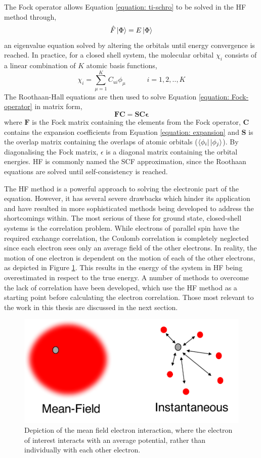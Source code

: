 The Fock operator allows Equation \ref{equation: ti-schro} to be solved in the \ac{HF} method through,
\begin{equation}\label{equation: Fock-operator}
    \hat{F}\ket{\Phi}=E\ket{\Phi}
\end{equation}
an eigenvalue equation solved by altering the orbitals until energy convergence is reached. In practice, for a closed shell system, the molecular orbital $\chi_{i}$ consists of a linear combination of $K$ atomic basis functions,
\begin{equation}\label{equation: expansion}
    \chi_{i}=\sum_{\mu=1}^{K}C_{ui}\phi_{\mu}\qquad\quad{}i=1,2,..,K
\end{equation}
The Roothaan-Hall equations are then used to solve Equation \ref{equation: Fock-operator} in matrix form,\cite{Roothaan1951,Hall1951}
\begin{equation}
    \bm{FC}={\bm{SC\epsilon}}
\end{equation}
where $\bm{F}$ is the Fock matrix containing the elements from the Fock operator, $\bm{C}$ contains the expansion coefficients from Equation \ref{equation: expansion} and $\bm{S}$ is the overlap matrix containing the overlaps of atomic orbitals ($\bra{\phi_{i}}\ket{\phi_{j}}$). By diagonalising the Fock matrix, $\epsilon$ is a diagonal matrix containing the orbital energies. \ac{HF} is commonly named the \ac{SCF} approximation, since the Roothaan equations are solved until self-consistency is reached.\cite{szabo1996}

The \ac{HF} method is a powerful approach to solving the electronic part of the \schro{} equation. However, it has several severe drawbacks which hinder its application and have resulted in more sophisticated methods being developed to address the shortcomings within. The most serious of these for ground state, closed-shell systems is the correlation problem. While electrons of parallel spin have the required exchange correlation, the Coulomb correlation is completely neglected since each electron sees only an average field of the other electrons. In reality, the motion of one electron is dependent on the motion of each of the other electrons, as depicted in Figure \ref{figure: mean-field}. This results in the energy of the system in \ac{HF} being overestimated in respect to the true energy. A number of methods to overcome the lack of correlation have been developed, which use the \ac{HF} method as a starting point before calculating the electron correlation. Those most relevant to the work in this thesis are discussed in the next section.
\begin{figure}[t]
\centering
  \includegraphics[width=0.4\linewidth]{2Theory/Mean_Field.pdf}
  \caption[Schematic of the mean-field approximation]{Depiction of the mean field electron interaction, where the electron of interest interacts with an average potential, rather than individually with each other electron.}
  \label{figure: mean-field}
\end{figure}


